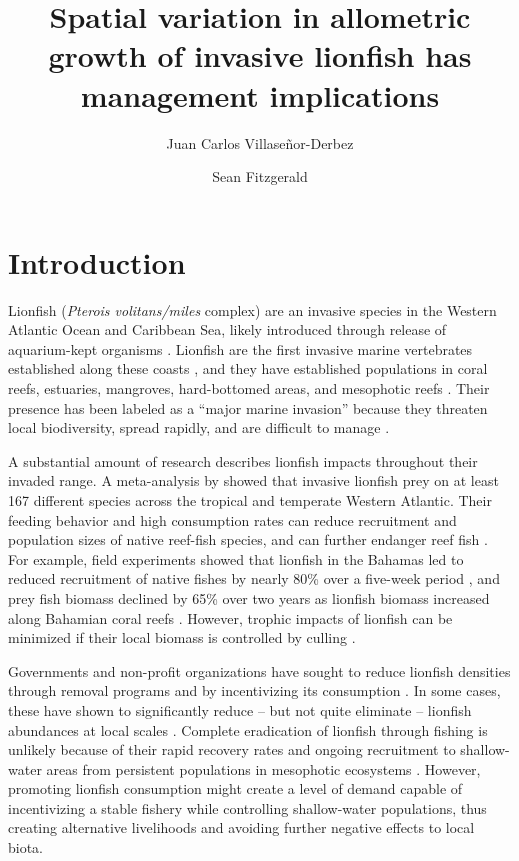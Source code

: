 \documentclass[fleqn,10pt,lineno]{wlpeerj} %
\title{Spatial variation in allometric growth of invasive lionfish has
management implications}
\author[1]{Juan Carlos Villaseñor-Derbez}
\author[1]{Sean Fitzgerald}
\affil[1]{Bren School of Environmental Science and Management, University of California, Santa Barbara, Santa Barbara, CA, United States}
\begin{document}
\flushbottom
\maketitle
\thispagestyle{empty}

\section*{Introduction}

Lionfish (\emph{Pterois volitans/miles} complex) are an invasive species
in the Western Atlantic Ocean and Caribbean Sea, likely introduced
through release of aquarium-kept organisms \citep{betancurr_2011}.
Lionfish are the first invasive marine vertebrates established along
these coasts \citep{schofield_2009,schofield_2010,sabidoitza_2016}, and
they have established populations in coral reefs, estuaries,
mangroves, hard-bottomed areas, and mesophotic reefs
\citep{barbour_2010,jud_2011,muoz_2011,claydon_2012,andradibrown_2017,gress_2017}.
Their presence has been labeled as a ``major marine invasion'' because
they threaten local biodiversity, spread rapidly, and are difficult to
manage \citep{hixon_2016}.

A substantial amount of research describes lionfish impacts throughout
their invaded range. A meta-analysis by \citet{peake_2018} showed that
invasive lionfish prey on at least 167 different species across the
tropical and temperate Western Atlantic. Their feeding behavior and high
consumption rates can reduce recruitment and population sizes of native
reef-fish species, and can further endanger reef fish
\citep[][but see \citealt{hackerott_2017} for a counterexample]{green_2012,rocha_2015}.
For example, field experiments showed that lionfish in the
Bahamas led to reduced recruitment of native fishes by nearly 80\% over
a five-week period \citep{albins_2008}, and prey fish biomass declined
by 65\% over two years as lionfish biomass increased along Bahamian
coral reefs \citep{green_2012}. However, trophic impacts of lionfish can
be minimized if their local biomass is controlled by culling
\citep{ariasgonzalez_2011}.

Governments and non-profit organizations have sought to reduce lionfish
densities through removal programs and by incentivizing its consumption
\citep{chin_2016}. In some cases, these have shown to significantly
reduce -- but not quite eliminate -- lionfish abundances at local scales
\citep{deleon_2013,sandel_2015}. Complete eradication of lionfish
through fishing is unlikely because of their rapid recovery rates and
ongoing recruitment to shallow-water areas from persistent populations
in mesophotic ecosystems \citep{barbour_2011,andradibrown_2017}.
However, promoting lionfish consumption might create a level of demand
capable of incentivizing a stable fishery while controlling
shallow-water populations, thus creating alternative livelihoods and
avoiding further negative effects to local biota.
\end{document}
